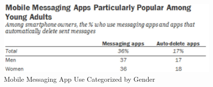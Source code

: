 \documentclass[12pt]{article}
\begin{document}
		\begin{figure}[H]
			\begin{center}
				\includegraphics[width=\textwidth,keepaspectratio]{StatsMessaging}
				\caption{Mobile Messaging App Use Categorized by Gender}		
			\end{center}
		\end{figure}
		
\end{document}
